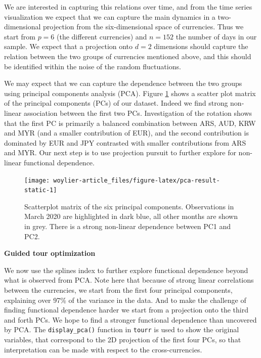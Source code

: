 We are interested in capturing this relations over time, and from the time series visualization we expect that we can capture the main dynamics in a two-dimensional projection from the six-dimensional space of currencies. Thus we start from \(p=6\) (the different currencies) and \(n=152\) the number of days in our sample. We expect that a projection onto \(d=2\) dimensions should capture the relation between the two groups of currencies mentioned above, and this should be identified within the noise of the random fluctuations.

We may expect that we can capture the dependence between the two groups using principal components analysis (PCA). Figure \ref{fig:pca-result-static} shows a scatter plot matrix of the principal components (PCs) of our dataset. Indeed we find strong non-linear association between the first two PCs. Investigation of the rotation shows that the first PC is primarily a balanced combination between ARS, AUD, KRW and MYR (and a smaller contribution of EUR), and the second contribution is dominated by EUR and JPY contrasted with smaller contributions from ARS and MYR. Our next step is to use projection pursuit to further explore for non-linear functional dependence.

\begin{figure}

{\centering \texttt{[image: woylier-article\_files/figure-latex/pca-result-static-1]} 

}

\caption{Scatterplot matrix of the six principal components. Observations in March 2020 are highlighted in dark blue, all other months are shown in grey. There is a strong non-linear dependence between PC1 and PC2.}\label{fig:pca-result-static}
\end{figure}

\textbf{Guided tour optimization}

We now use the splines index to further explore functional dependence beyond what is observed from PCA. Note here that because of strong linear correlations between the currencies, we start from the first four principal components, explaining over 97\% of the variance in the data. And to make the challenge of finding functional dependence harder we start from a projection onto the third and forth PCs. We hope to find a stronger functional dependence than uncovered by PCA. The \texttt{display\_pca()} function in \texttt{tourr} is used to show the original variables, that correspond to the 2D projection of the first four PCs, so that interpretation can be made with respect to the cross-currencies.

